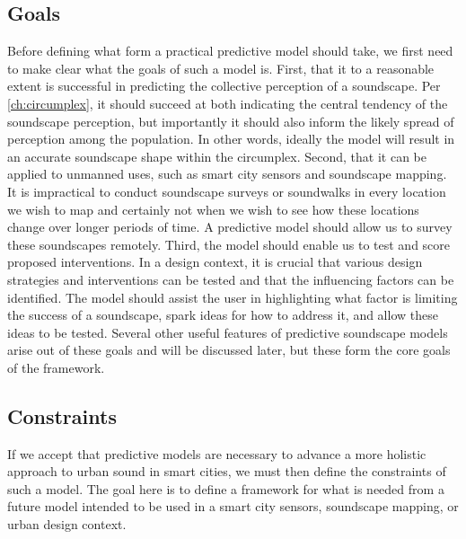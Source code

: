 \subsection{Goals}
Before defining what form a practical predictive model should take, we first need to make clear what the goals of such a model is. First, that it to a reasonable extent is successful in predicting the collective perception of a soundscape. Per \cref{ch:circumplex}, it should succeed at both indicating the central tendency of the soundscape perception, but importantly it should also inform the likely spread of perception among the population. In other words, ideally the model will result in an accurate soundscape shape within the circumplex. Second, that it can be applied to unmanned uses, such as smart city sensors and soundscape mapping. It is impractical to conduct soundscape surveys or soundwalks in every location we wish to map and certainly not when we wish to see how these locations change over longer periods of time. A predictive model should allow us to survey these soundscapes remotely. Third, the model should enable us to test and score proposed interventions. In a design context, it is crucial that various design strategies and interventions can be tested and that the influencing factors can be identified. The model should assist the user in highlighting what factor is limiting the success of a soundscape, spark ideas for how to address it, and allow these ideas to be tested. Several other useful features of predictive soundscape models arise out of these goals and will be discussed later, but these form the core goals of the framework.

\subsection{Constraints}
If we accept that predictive models are necessary to advance a more holistic approach to urban sound in smart cities, we must then define the constraints of such a model. The goal here is to define a framework for what is needed from a future model intended to be used in a smart city sensors, soundscape mapping, or urban design context.

